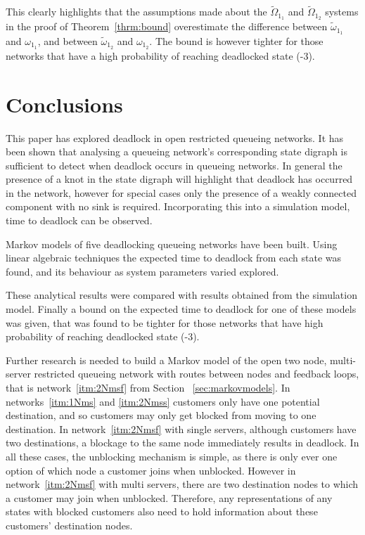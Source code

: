 \documentclass{article}
\numberwithin{equation}{section}
\begin{document}
This clearly highlights that the assumptions made about the $\widetilde{\Omega}_{1_1}$ and $\widetilde{\Omega}_{1_2}$ systems in the proof of Theorem~\ref{thrm:bound} overestimate the difference between $\widetilde{\omega}_{1_1}$ and $\omega_{1_1}$, and between $\widetilde{\omega}_{1_2}$ and $\omega_{1_2}$.
The bound is however tighter for those networks that have a high probability of reaching deadlocked state (-3).


\section{Conclusions}\label{sec:conclusions}

This paper has explored deadlock in open restricted queueing networks.
It has been shown that analysing a queueing network's corresponding state digraph is sufficient to detect when deadlock occurs in queueing networks.
In general the presence of a knot in the state digraph will highlight that deadlock has occurred in the network, however for special cases only the presence of a weakly connected component with no sink is required.
Incorporating this into a simulation model, time to deadlock can be observed.

Markov models of five deadlocking queueing networks have been built.
Using linear algebraic techniques the expected time to deadlock from each state was found, and its behaviour as system parameters varied explored.

These analytical results were compared with results obtained from the simulation model.
Finally a bound on the expected time to deadlock for one of these models was given, that was found to be tighter for those networks that have high probability of reaching deadlocked state (-3).

Further research is needed to build a Markov model of the open two node, multi-server restricted queueing network with routes between nodes and feedback loops, that is network~\ref{itm:2Nmsf} from Section ~\ref{sec:markovmodels}.
In networks~\ref{itm:1Nms} and \ref{itm:2Nmss} customers only have one potential destination, and so customers may only get blocked from moving to one destination.
In network~\ref{itm:2Nmsf} with single servers, although customers have two destinations, a blockage to the same node immediately results in deadlock.
In all these cases, the unblocking mechanism is simple, as there is only ever one option of which node a customer joins when unblocked.
However in network~\ref{itm:2Nmsf} with multi servers, there are two destination nodes to which a customer may join when unblocked.
Therefore, any representations of any states with blocked customers also need to hold information about these customers' destination nodes.
\end{document}
